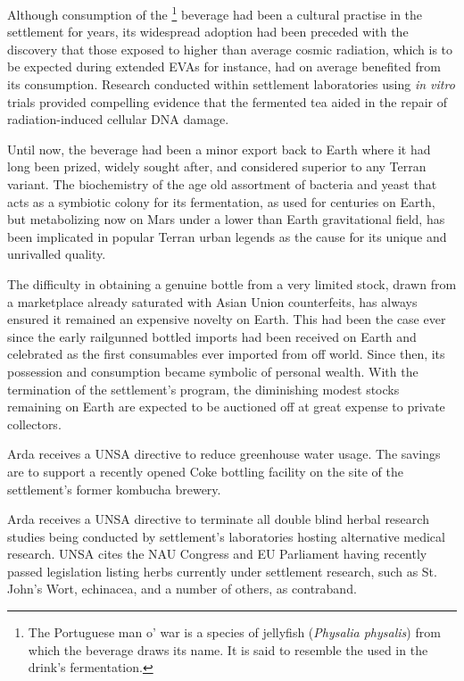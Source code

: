 Although consumption of the \footnote{The Portuguese man o' war is a species of jellyfish ({\it Physalia physalis}) from which the beverage draws its name. It is said to resemble the  used in the drink's fermentation.} beverage had been a cultural practise in the settlement for years, its widespread adoption had been preceded with the discovery that those exposed to higher than average cosmic radiation, which is to be expected during extended EVAs for instance, had on average benefited from its consumption. Research conducted within settlement laboratories using {\it in vitro} trials provided compelling evidence that the fermented tea aided in the repair of radiation-induced cellular DNA damage. 

Until now, the beverage had been a minor export back to Earth where it had long been prized, widely sought after, and considered superior to any Terran variant. The biochemistry of the age old assortment of bacteria and yeast that acts as a symbiotic colony for its fermentation, as used for centuries on Earth, but metabolizing now on Mars under a lower than Earth gravitational field, has been implicated in popular Terran urban legends as the cause for its unique and unrivalled quality. 

The difficulty in obtaining a genuine bottle from a very limited stock, drawn from a marketplace already saturated with Asian Union counterfeits, has always ensured it remained an expensive novelty on Earth. This had been the case ever since the early railgunned bottled imports had been received on Earth and celebrated as the first consumables ever imported from off world. Since then, its possession and consumption became symbolic of personal wealth. With the termination of the settlement's program, the diminishing modest stocks remaining on Earth are expected to be auctioned off at great expense to private collectors.
\StopTimelineDate

Arda receives a UNSA directive to reduce greenhouse water usage. The savings are to support a recently opened Coke bottling facility on the site of the settlement's former kombucha brewery.
\StopTimelineDate

Arda receives a UNSA directive to terminate all double blind herbal research studies being conducted by settlement's laboratories hosting alternative medical research. UNSA cites the NAU Congress and EU Parliament having recently passed legislation listing herbs currently under settlement research, such as St. John's Wort, echinacea, and a number of others, as contraband. 

